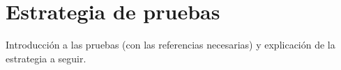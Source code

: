 \section{\forlnameref Estrategia de pruebas}
\label{sec:testsStrategy}

\begin{shaded}
Introducción a las pruebas (con las referencias necesarias) y explicación de la estrategia a seguir.
\end{shaded}

